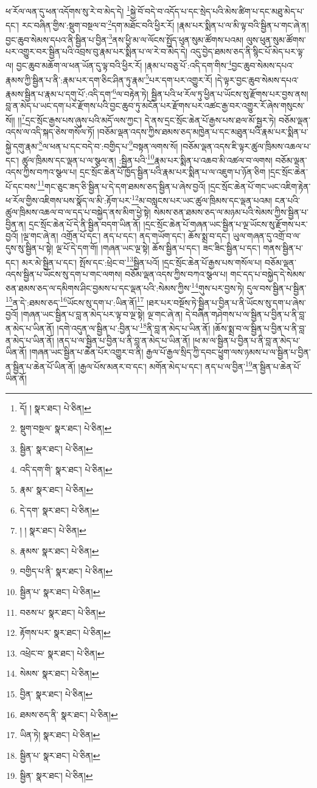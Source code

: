 ཕ་རོལ་ལན་དུ་ཕན་འདོགས་སུ་རེ་བ་མེད་དེ། \footnote{དོ། །   སྣར་ཐང་།  པེ་ཅིན། }སྐྱེ་བོ་བདེ་བ་འདོད་པ་དང་སྲེད་པའི་མེས་ཚིག་པ་དང་མཐུ་མེད་པ་དང་། རང་བཞིན་གྱིས་:སྡུག་བསྔལ་བ་\footnote{སྡུག་བསྔལ་  སྣར་ཐང་།  པེ་ཅིན། }དག་མཐོང་བའི་ཕྱིར་རོ། །རྣམ་པར་སྨིན་པ་ལ་མི་ལྟ་བའི་སྦྱིན་པ་གང་ཞེ་ན། བྱང་ཆུབ་སེམས་དཔའ་ནི་སྦྱིན་པ་བྱིན་\footnote{སྦྱིན་  སྣར་ཐང་།  པེ་ཅིན། }ནས་ཕྱི་མ་ལ་ལོངས་སྤྱོད་ཕུན་སུམ་ཚོགས་པའམ། ལུས་ཕུན་སུམ་ཚོགས་པར་འགྱུར་བར་སྦྱིན་པའི་འབྲས་བུ་རྣམ་པར་སྨིན་པ་ལ་རེ་བ་མེད་དེ། འདུ་བྱེད་ཐམས་ཅད་ནི་སྙིང་པོ་མེད་པར་ལྟ་ལ། བྱང་ཆུབ་མཆོག་ལ་ཕན་ཡོན་དུ་ལྟ་བའི་ཕྱིར་རོ། །རྣམ་པ་བཅུ་པོ་:འདི་དག་གིས་\footnote{འདི་དག་གི་  སྣར་ཐང་།  པེ་ཅིན། }བྱང་ཆུབ་སེམས་དཔའ་རྣམས་ཀྱི་སྦྱིན་པ་ནི་:རྣམ་པར་དག་ཅིང་ཤིན་ཏུ་རྣམ་\footnote{རྣམ་  སྣར་ཐང་།  པེ་ཅིན། }པར་དག་པར་འགྱུར་རོ། །དེ་ལྟར་བྱང་ཆུབ་སེམས་དཔའ་རྣམས་སྦྱིན་པ་རྣམ་པ་དགུ་པོ་:འདི་དག་\footnote{དེ་དག་  སྣར་ཐང་།  པེ་ཅིན། }ལ་བརྟེན་ཏེ། སྦྱིན་པའི་ཕ་རོལ་ཏུ་ཕྱིན་པ་ཡོངས་སུ་རྫོགས་པར་བྱས་ནས། བླ་ན་མེད་པ་ཡང་དག་པར་རྫོགས་པའི་བྱང་ཆུབ་ཏུ་མངོན་པར་རྫོགས་པར་འཚང་རྒྱ་བར་འགྱུར་རོ་ཞེས་གསུངས་སོ།། །།\footnote{། །  སྣར་ཐང་།  པེ་ཅིན། }དྲང་སྲོང་རྒྱས་པས་ཞུས་པའི་མདོ་ལས་ཀྱང་། དེ་ནས་དྲང་སྲོང་ཆེན་པོ་རྒྱས་པས་ཐལ་མོ་སྦྱར་ཏེ། བཅོམ་ལྡན་འདས་ལ་འདི་སྐད་ཅེས་གསོལ་ཏོ། །བཅོམ་ལྡན་འདས་ཀྱིས་ཐམས་ཅད་མཁྱེན་པ་དང་མཐུན་པའི་རྣམ་པར་སྨིན་པ་སྐྱེ་དགུ་རྣམ་\footnote{རྣམས་  སྣར་ཐང་།  པེ་ཅིན། }ལ་ཕན་པ་དང་བདེ་བ་:བགྱིད་པ་\footnote{བགྱིད་པ་ནི་  སྣར་ཐང་།  པེ་ཅིན། }བསྟན་ལགས་སོ། །བཅོམ་ལྡན་འདས་ཇི་ལྟར་ཚུལ་ཁྲིམས་འཆལ་པ་དང་། ཚུལ་ཁྲིམས་དང་ལྡན་པ་ལ་སྩལ་ན། :སྦྱིན་པའི་\footnote{སྦྱིན་པ་  སྣར་ཐང་།  པེ་ཅིན། }རྣམ་པར་སྨིན་པ་འཆབ་མི་འཚལ་བ་ལགས། བཅོམ་ལྡན་འདས་ཀྱིས་བཀའ་སྩལ་པ། དྲང་སྲོང་ཆེན་པོ་ཁྱོད་སྦྱིན་པའི་རྣམ་པར་སྨིན་པ་ལ་འཇུག་པ་ཉོན་ཅིག །དྲང་སྲོང་ཆེན་པོ་དང་བས་\footnote{བཅས་པ་  སྣར་ཐང་།  པེ་ཅིན། }གང་ཅུང་ཟད་ཅི་སྦྱིན་པ་དེ་དག་ཐམས་ཅད་སྦྱིན་པ་ཞེས་བྱའོ། །དྲང་སྲོང་ཆེན་པོ་གང་ཡང་འཇིག་རྟེན་ཕ་རོལ་གྱིས་འཇིགས་པས་སྣོད་ལ་མི་:རྟོག་པར་\footnote{རྟོགས་པར་  སྣར་ཐང་།  པེ་ཅིན། }མ་བསླངས་པར་ཡང་ཚུལ་ཁྲིམས་དང་ལྡན་པའམ། ངན་པའི་ཚུལ་ཁྲིམས་འཆལ་བ་ལ་དད་པ་བསྐྱེད་ནས་མིག་ཕྱེ་སྟེ། སེམས་ཅན་ཐམས་ཅད་ལ་མཉམ་པའི་སེམས་ཀྱིས་སྦྱིན་པ་བྱིན་ན། དྲང་སྲོང་ཆེན་པོ་དེ་ནི་སྦྱིན་བདག་ཡིན་ནོ། །དྲང་སྲོང་ཆེན་པོ་གཞན་ཡང་སྦྱིན་པ་ལྔ་ཡོངས་སུ་རྫོགས་པར་བྱའོ། །ལྔ་གང་ཞེ་ན། འགྲོན་པོ་དང་། ནད་པ་དང་། ནད་གཡོག་དང་། ཆོས་སྨྲ་བ་དང་། ཡུལ་གཞན་དུ་འགྲོ་བ་ལ་དུས་སུ་སྦྱིན་པ་སྟེ། ལྔ་པོ་དེ་དག་གོ། །གཞན་ཡང་ལྔ་སྟེ། ཆོས་སྦྱིན་པ་དང་། ཟང་ཟིང་སྦྱིན་པ་དང་། གནས་སྦྱིན་པ་དང་། མར་མེ་སྦྱིན་པ་དང་། སྤོས་དང་:ཕྲེང་བ་\footnote{འཕྲེང་བ་  སྣར་ཐང་།  པེ་ཅིན། }སྦྱིན་པའོ། །དྲང་སྲོང་ཆེན་པོ་རྒྱས་པས་གསོལ་པ། བཅོམ་ལྡན་འདས་སྦྱིན་པ་ཡོངས་སུ་དག་པ་གང་ལགས། བཅོམ་ལྡན་འདས་ཀྱིས་བཀའ་སྩལ་པ། གང་དད་པ་བསྐྱེད་དེ་སེམས་ཅན་ཐམས་ཅད་ལ་དམིགས་ཤིང་བྱམས་པ་དང་ལྡན་པའི་:སེམས་ཀྱིས་\footnote{སེམས་  སྣར་ཐང་།  པེ་ཅིན། }གུས་པར་བྱས་ཏེ། དུལ་བས་སྦྱིན་པ་སྦྱིན་\footnote{བྱིན་  སྣར་ཐང་།  པེ་ཅིན། }ན་དེ་:ཐམས་ཅད་\footnote{ཐམས་ཅད་ནི་  སྣར་ཐང་།  པེ་ཅིན། }ཡོངས་སུ་དག་པ་:ཡིན་ནོ།\footnote{ཡིན་ཏེ།  སྣར་ཐང་།  པེ་ཅིན། } །ཐར་པར་བསྔོས་ཏེ་སྦྱིན་པ་བྱིན་པ་ནི་ཡོངས་སུ་དག་པ་ཞེས་བྱའོ། །གཞན་ཡང་སྦྱིན་པ་བླ་ན་མེད་པར་ལྟ་བ་ལྔ་སྟེ། ལྔ་གང་ཞེ་ན། དེ་བཞིན་གཤེགས་པ་ལ་སྦྱིན་པ་བྱིན་པ་ནི་བླ་ན་མེད་པ་ཡིན་ནོ། །དགེ་འདུན་ལ་སྦྱིན་པ་:བྱིན་པ་\footnote{སྦྱིན་པ་  སྣར་ཐང་།  པེ་ཅིན། }ནི་བླ་ན་མེད་པ་ཡིན་ནོ། །ཆོས་སྨྲ་བ་ལ་སྦྱིན་པ་བྱིན་པ་ནི་བླ་ན་མེད་པ་ཡིན་ནོ། །ནད་པ་ལ་སྦྱིན་པ་བྱིན་པ་ནི་བླ་ན་མེད་པ་ཡིན་ནོ། །ཕ་མ་ལ་སྦྱིན་པ་བྱིན་པ་ནི་བླ་ན་མེད་པ་ཡིན་ནོ། །གཞན་ཡང་སྦྱིན་པ་ཆེན་པོར་འགྱུར་བ་ནི། རྒྱལ་པོ་རྒྱལ་སྲིད་ཀྱི་དབང་ཕྱུག་ལས་ཉམས་པ་ལ་སྦྱིན་པ་བྱིན་ན་སྦྱིན་པ་ཆེན་པོ་ཡིན་ནོ། །རྒྱལ་པོས་མནར་བ་དང་། མགོན་མེད་པ་དང་། ནད་པ་ལ་བྱིན་\footnote{སྦྱིན་  སྣར་ཐང་།  པེ་ཅིན། }ན་སྦྱིན་པ་ཆེན་པོ་ཡིན་ནོ། 